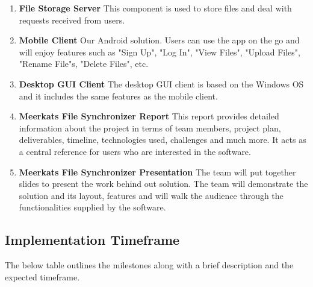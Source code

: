\documentclass{article}
\begin{document}
\begin{enumerate}

  \item \textbf{File Storage Server} This component is used to store files and deal with requests received from users.
  \item \textbf{Mobile Client} Our Android solution. Users can use the app on the go and will enjoy features such as "Sign Up", "Log In", "View Files", "Upload Files", "Rename File"s, "Delete Files", etc.
  \item \textbf{Desktop GUI Client} The desktop GUI client is based on the Windows OS and it includes the same features as the mobile client.
  \item \textbf{Meerkats File Synchronizer Report} This report provides detailed information about the project in terms of team members, project plan, deliverables, timeline, technologies used, challenges and much more. It acts as a central reference for users who are interested in the software.
  \item \textbf{Meerkats File Synchronizer Presentation} The team will put together slides to present the work behind out solution. The team will demonstrate the solution and its layout, features and will walk the audience through the functionalities supplied by the software.

\end{enumerate}

\subsection{Implementation Timeframe}
The below table outlines the milestones along with a brief description and the expected timeframe.
\end{document}
